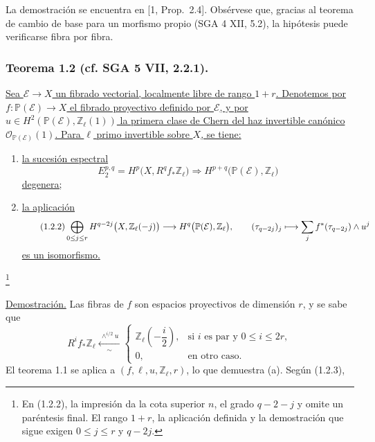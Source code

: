 La demostración se encuentra en [1, Prop.~2.4]. Obsérvese que, gracias
al teorema de cambio de base para un morfismo propio (SGA 4 XII, 5.2),
la hipótesis puede verificarse fibra por fibra.

\pageoriginale

\subsubsection*{Teorema 1.2 (cf. SGA 5 VII, 2.2.1).}
\underline{Sea $\mathcal E\longrightarrow X$ un fibrado vectorial,
localmente libre de rango $1+r$. Denotemos por
$f:\mathbb P(\mathcal E)\longrightarrow X$ el fibrado proyectivo
definido por $\mathcal E$, y por
$u\in H^2(\mathbb P(\mathcal E),\mathbb Z_\ell(1))$ la primera clase de
Chern del haz invertible canónico
$\mathcal O_{\mathbb P(\mathcal E)}(1)$. Para $\ell$ primo invertible
sobre $X$, se tiene:}
\begin{enumerate}
\item[(a)] \underline{la sucesión espectral}
\begin{equation}\tag{1.2.1}
E_2^{p,q}=H^p\bigl(X,R^qf_*\mathbb Z_\ell\bigr)
\Longrightarrow
H^{p+q}\bigl(\mathbb P(\mathcal E),\mathbb Z_\ell\bigr)
\end{equation}
\underline{degenera;}
\item[(b)] \underline{la aplicación}
{\small\begin{equation}\tag{1.2.2}
\bigoplus_{0\leq j\leq \sisi{n}{r}}
\sisi{H^{q-2-j}\bigl(X,\mathbb Z_\ell(-j)}
      {H^{q-2j}\bigl(X,\mathbb Z_\ell(-j)\bigr)}
\longrightarrow
H^q\bigl(\mathbb P(\mathcal E),\mathbb Z_\ell\bigr),
\qquad
(\tau_{q-2j})_j\longmapsto
\sum_j f^*(\tau_{q-2j})\wedge u^j
\end{equation}}
\underline{es un isomorfismo.}
\end{enumerate}
\footnote{En (1.2.2), la impresión da la cota superior $n$, el grado
$q-2-j$ y omite un paréntesis final. El rango $1+r$, la aplicación
definida y la demostración que sigue exigen $0\leq j\leq r$ y $q-2j$.}

\noindent\underline{Demostración.}
Las fibras de $f$ son espacios proyectivos de dimensión $r$, y se sabe
que
\begin{equation}\tag{1.2.3}
R^if_*\mathbb Z_\ell
\xleftarrow[\ \sim\ ]{\ \wedge^{i/2}u\ }
\begin{cases}
\mathbb Z_\ell\left(-\dfrac{i}{2}\right),
  & \text{si $i$ es par y $0\leq i\leq2r$},\\[2ex]
0, & \text{en otro caso}.
\end{cases}
\end{equation}
El teorema 1.1 se aplica a $(f,\ell,u,\mathbb Z_\ell,r)$, lo que
demuestra (a). Según (1.2.3),

